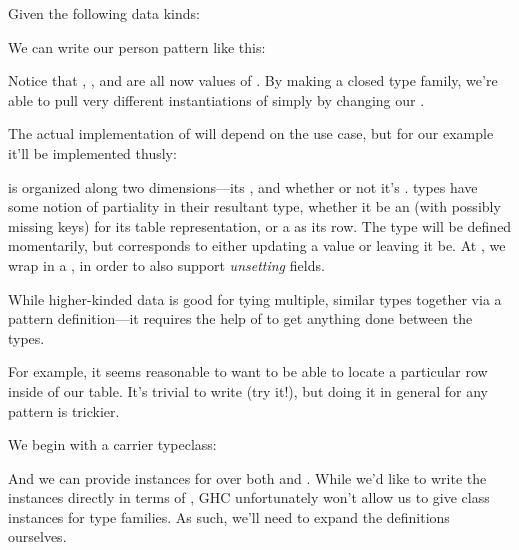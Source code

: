 \documentclass[book.tex]{subfiles}
\begin{document}
Given the following data kinds:


We can write our person pattern like this:


Notice that , , and  are all now values of
. By making  a closed type family, we're able to pull
very different instantiations of  simply by changing our
 .

The actual implementation of  will depend on the use case, but for
our example it'll be implemented thusly:


 is organized along two dimensions---its , and
whether or not it's .  types have some notion of
partiality in their resultant type, whether it be an  (with
possibly missing keys) for its table representation, or a  as its
row. The  type will be defined momentarily, but corresponds to either
updating a value or leaving it be. At , we wrap  in a
, in order to also support \emph{unsetting} fields.


While higher-kinded data is good for tying multiple, similar types together via
a pattern definition---it requires the help of  to get anything
done between the types.

For example, it seems reasonable to want to be able to locate a particular row
inside of our table. It's trivial to write  (try it!), but doing it in general
for any pattern is trickier.

We begin with a carrier typeclass:


And we can provide instances for  over both  and . While we'd like to write the instances
directly in terms of , GHC unfortunately won't allow us to give class
instances for type families. As such, we'll need to expand the definitions
ourselves.

\end{document}
